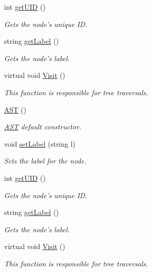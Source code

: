 \begin{DoxyCompactItemize}
int \hyperlink{classAST_ab7a5b1d9f1c2de0d98deb356f724a42c}{get\-U\-I\-D} ()
\begin{DoxyCompactList}\small\item\em Gets the node's unique I\-D. \end{DoxyCompactList}\item 
string \hyperlink{classAST_aee029be902fffc927d16ccb03eb922ad}{get\-Label} ()
\begin{DoxyCompactList}\small\item\em Gets the node's label. \end{DoxyCompactList}\item 
virtual void \hyperlink{classAST_a5828cc86f2c4f1a0aeab6d7069e8fd82}{Visit} ()
\begin{DoxyCompactList}\small\item\em This function is responsible for tree traversals. \end{DoxyCompactList}\item 
\hyperlink{classAST_afd378ca7cb3049d6293e8597d31d758d}{A\-S\-T} ()
\begin{DoxyCompactList}\small\item\em \hyperlink{classAST}{A\-S\-T} default constructor. \end{DoxyCompactList}\item 
void \hyperlink{classAST_a71d680856e95ff89f55d5311a552eba6}{set\-Label} (string l)
\begin{DoxyCompactList}\small\item\em Sets the label for the node. \end{DoxyCompactList}\item 
int \hyperlink{classAST_ab7a5b1d9f1c2de0d98deb356f724a42c}{get\-U\-I\-D} ()
\begin{DoxyCompactList}\small\item\em Gets the node's unique I\-D. \end{DoxyCompactList}\item 
string \hyperlink{classAST_aee029be902fffc927d16ccb03eb922ad}{get\-Label} ()
\begin{DoxyCompactList}\small\item\em Gets the node's label. \end{DoxyCompactList}\item 
virtual void \hyperlink{classAST_a5828cc86f2c4f1a0aeab6d7069e8fd82}{Visit} ()
\begin{DoxyCompactList}\small\item\em This function is responsible for tree traversals. \end{DoxyCompactList}\item 

\end{DoxyCompactItemize}
